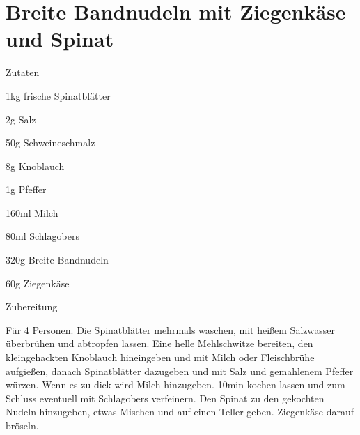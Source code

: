 \chapter*{Breite Bandnudeln mit Ziegenkäse und Spinat}
\begin{multicols}{2}
 {\Large Zutaten}
 \begin{Zutaten}
		\item 1kg frische Spinatblätter
		\item 2g Salz
		\item 50g Schweineschmalz
		\item 8g Knoblauch
		\item 1g Pfeffer
		\item 160ml Milch
		\item 80ml Schlagobers
		\item 320g Breite Bandnudeln
		\item 60g Ziegenkäse
		
		
\end{Zutaten}
	
\columnbreak
\end{multicols}

{\Large Zubereitung} \newline
\begin{addmargin}[1cm]{0cm}
	Für 4 Personen.
	Die Spinatblätter mehrmals waschen, mit heißem Salzwasser überbrühen und abtropfen lassen. Eine
	helle Mehlschwitze bereiten, den kleingehackten Knoblauch hineingeben und mit Milch oder
	Fleischbrühe aufgießen, danach Spinatblätter dazugeben und mit Salz und gemahlenem Pfeffer würzen.\newline
	Wenn es zu dick wird Milch hinzugeben. 10min kochen lassen und zum Schluss eventuell mit Schlagobers
	verfeinern.\newline
	Den Spinat zu den gekochten Nudeln hinzugeben, etwas Mischen und auf einen Teller geben.
	Ziegenkäse darauf bröseln.
	
	
\end{addmargin}

